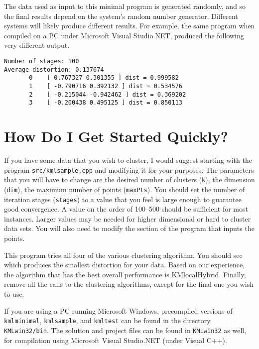 \documentclass[11pt]{article}		%
\begin{document}
The data used as input to this minimal program is generated randomly,
and so the final results depend on the system's random number generator.
Different systems will likely produce different results.  For example,
the same program when compiled on a PC under Microsoft Visual
Studio.NET, produced the following very different output.
{\small\begin{verbatim}
Number of stages: 100
Average distortion: 0.137674
       0	[ 0.767327 0.301355 ] dist = 0.999582
       1	[ -0.790716 0.392132 ] dist = 0.534576
       2	[ -0.215044 -0.942462 ] dist = 0.369202
       3	[ -0.200438 0.495125 ] dist = 0.850113
\end{verbatim}}

\section{How Do I Get Started Quickly?}

If you have some data that you wish to cluster, I would suggest starting
with the program \texttt{src/kmlsample.cpp} and modifying it for your
purposes.  The parameters that you will have to change are the desired
number of clusters (\texttt{k}), the dimension (\texttt{dim}), the
maximum number of points (\texttt{maxPts}).  You should set the number
of iteration stages  (\texttt{stages}) to a value that you feel is large
enough to guarantee good convergence.  A value on the order of 100--500
should be sufficient for most instances.  Larger values may be needed
for higher dimensional or hard to cluster data sets.  You will also need
to modify the section of the program that inputs the points.

This program tries all four of the various clustering algorithm.  You
should see which produces the smallest distortion for your data.  Based
on our experience, the algorithm that has the best overall performance
is KMlocalHybrid.  Finally, remove all the calls to the clustering
algorithms, except for the final one you wish to use.

If you are using a PC running Microsoft Windows, precompiled versions of
\texttt{kmlminimal}, \texttt{kmlsample}, and \texttt{kmltest} can be
found in the directory \texttt{KMLwin32/bin}.  The solution and project
files can be found in \texttt{KMLwin32} as well, for compilation using
Microsoft Visual Studio.NET (under Visual C++).
\end{document}
